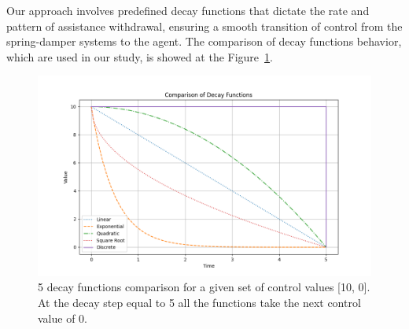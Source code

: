 Our approach involves predefined decay functions that dictate the rate and pattern of assistance withdrawal, ensuring a smooth transition of control from the spring-damper systems to the agent. The comparison of decay functions behavior, which are used in our study, is showed at the Figure~\ref{fig: decay functions}.

\begin{figure}[ht]
	\centering
	\includegraphics[width=13cm]{Figures/CL_decay_types_comparison.png}
	\caption{5 decay functions comparison for a given set of control values [10, 0]. At the decay step equal to 5 all the functions take the next control value of 0.}
	\label{fig: decay functions}
\end{figure}
